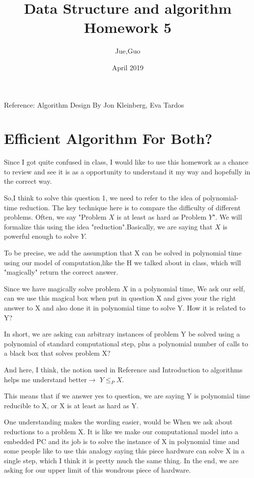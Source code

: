 \documentclass{article}
\title{Data Structure and algorithm \rom{2}\\Homework 5}
\author{Jue,Guo}
\date{April 2019}
\begin{document}
\maketitle
\renewcommand{\thesection}{\Roman{section}} 
Reference: Algorithm Design By Jon Kleinberg, Eva Tardos 
\section{Efficient Algorithm For Both?}
Since I got quite confused in class, I would like to use this homework as a chance to review and see it is as a opportunity to understand it my way and hopefully in the correct way. 

So,I think to solve this question 1, we need to refer to the idea of polynomial-time reduction. The key technique here is to compare the difficulty of different problems. Often, we say "Problem $X$ is at least as hard as Problem $Y$". We will formalize this using the idea "reduction".Basically, we are saying that $X$ is powerful enough to solve $Y$. 

To be precise, we add the assumption that X can be solved in polynomial time using our model of computation,like the H we talked about in class, which will "magically" return the correct answer. 

Since we have magically solve problem $X$ in a polynomial time, We ask our self, can we use this magical box when put in question X and gives your the right answer to X and also done it in polynomial time to solve Y. How it is related to Y? 

In short, we are asking can arbitrary instances of problem Y be solved using a polynomial of standard computational step, plus a polynomial number of calls to a black box that solves problem X?

And here, I think, the notion used in Reference and Introduction to algorithms helps me understand better$\rightarrow$ $Y \leq_{P} X$. 

This means that if we answer yes to question, we are saying Y is polynomial time  reducible to X, or X is at least as hard as Y. 

One understanding makes the wording easier, would be When we ask about reductions to a problem X. It is like we make our computational model into a embedded PC and its job is to solve the instance of X in polynomial time and some people like to use this analogy saying this piece hardware can solve X in a single step, which I think it is pretty much the same thing. In the end, we are asking for our upper limit of this wondrous piece of hardware. 
\end{document}
